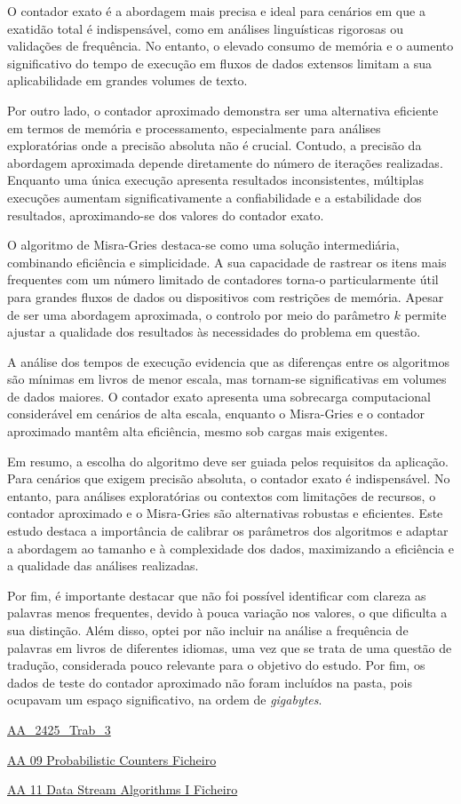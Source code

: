 \documentclass[shortpaper, portugues, times, mirror]{revdetua}
\begin{document}
O contador exato é a abordagem mais precisa e ideal para cenários em que a exatidão total é indispensável, como em análises linguísticas rigorosas ou validações de frequência. No entanto, o elevado consumo de memória e o aumento significativo do tempo de execução em fluxos de dados extensos limitam a sua aplicabilidade em grandes volumes de texto.

Por outro lado, o contador aproximado demonstra ser uma alternativa eficiente em termos de memória e processamento, especialmente para análises exploratórias onde a precisão absoluta não é crucial. Contudo, a precisão da abordagem aproximada depende diretamente do número de iterações realizadas. Enquanto uma única execução apresenta resultados inconsistentes, múltiplas execuções aumentam significativamente a confiabilidade e a estabilidade dos resultados, aproximando-se dos valores do contador exato.

O algoritmo de Misra-Gries destaca-se como uma solução intermediária, combinando eficiência e simplicidade. A sua capacidade de rastrear os itens mais frequentes com um número limitado de contadores torna-o particularmente útil para grandes fluxos de dados ou dispositivos com restrições de memória. Apesar de ser uma abordagem aproximada, o controlo por meio do parâmetro \(k\) permite ajustar a qualidade dos resultados às necessidades do problema em questão.

A análise dos tempos de execução evidencia que as diferenças entre os algoritmos são mínimas em livros de menor escala, mas tornam-se significativas em volumes de dados maiores. O contador exato apresenta uma sobrecarga computacional considerável em cenários de alta escala, enquanto o Misra-Gries e o contador aproximado mantêm alta eficiência, mesmo sob cargas mais exigentes.

Em resumo, a escolha do algoritmo deve ser guiada pelos requisitos da aplicação. Para cenários que exigem precisão absoluta, o contador exato é indispensável. No entanto, para análises exploratórias ou contextos com limitações de recursos, o contador aproximado e o Misra-Gries são alternativas robustas e eficientes. Este estudo destaca a importância de calibrar os parâmetros dos algoritmos e adaptar a abordagem ao tamanho e à complexidade dos dados, maximizando a eficiência e a qualidade das análises realizadas.

Por fim, é importante destacar que não foi possível identificar com clareza as palavras menos frequentes, devido à pouca variação nos valores, o que dificulta a sua distinção. Além disso, optei por não incluir na análise a frequência de palavras em livros de diferentes idiomas, uma vez que se trata de uma questão de tradução, considerada pouco relevante para o objetivo do estudo. Por fim, os dados de teste do contador aproximado não foram incluídos na pasta, pois ocupavam um espaço significativo, na ordem de \textit{gigabytes}.

\begin{thebibliography}{2}

\bibitem{}
\url{AA_2425_Trab_3}

\bibitem{}
\url{AA 09 Probabilistic Counters Ficheiro}

\bibitem{}
\url{AA 11 Data Stream Algorithms I Ficheiro}
\end{thebibliography}
\end{document}
